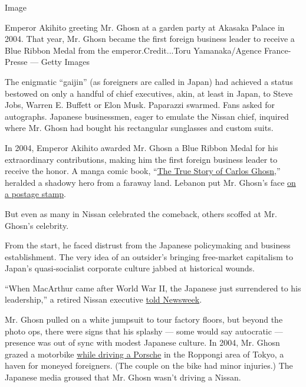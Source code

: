 Image

Emperor Akihito greeting Mr. Ghosn at a garden party at Akasaka Palace
in 2004. That year, Mr. Ghosn became the first foreign business leader
to receive a Blue Ribbon Medal from the emperor.Credit...Toru
Yamanaka/Agence France-Presse --- Getty Images

The enigmatic ``gaijin'' (as foreigners are called in Japan) had
achieved a status bestowed on only a handful of chief executives, akin,
at least in Japan, to Steve Jobs, Warren E. Buffett or Elon Musk.
Paparazzi swarmed. Fans asked for autographs. Japanese businessmen,
eager to emulate the Nissan chief, inquired where Mr. Ghosn had bought
his rectangular sunglasses and custom suits.

In 2004, Emperor Akihito awarded Mr. Ghosn a Blue Ribbon Medal for his
extraordinary contributions, making him the first foreign business
leader to receive the honor. A manga comic book,
``\href{https://www.archynety.com/business/when-carlos-ghosn-was-a-manga-hero/}{The
True Story of Carlos Ghosn},'' heralded a shadowy hero from a faraway
land. Lebanon put Mr. Ghosn's face
\href{https://www.cnn.com/2018/11/23/business/carlos-ghosn-lebanon-icon/index.html}{on
a postage stamp}.

But even as many in Nissan celebrated the comeback, others scoffed at
Mr. Ghosn's celebrity.

From the start, he faced distrust from the Japanese policymaking and
business establishment. The very idea of an outsider's bringing
free-market capitalism to Japan's quasi-socialist corporate culture
jabbed at historical wounds.

``When MacArthur came after World War II, the Japanese just surrendered
to his leadership,'' a retired Nissan executive
\href{https://www.newsweek.com/can-company-be-saved-167730}{told
Newsweek}.

Mr. Ghosn pulled on a white jumpsuit to tour factory floors, but beyond
the photo ops, there were signs that his splashy --- some would say
autocratic --- presence was out of sync with modest Japanese culture. In
2004, Mr. Ghosn grazed a motorbike
\href{https://www.autonews.com/article/20040209/REG/402090904/nissan-ceo-ghosn-in-accident-driving-porsche}{while
driving a Porsche} in the Roppongi area of Tokyo, a haven for moneyed
foreigners. (The couple on the bike had minor injuries.) The Japanese
media groused that Mr. Ghosn wasn't driving a Nissan.

